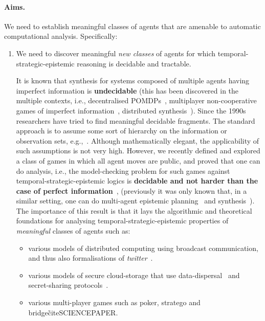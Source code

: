 \documentclass[a4paper,12pt,smallheadings]{scrartcl}
\newcommand\pomdp{\textsf{POMDP}}
\begin{document}
\paragraph{Aims.} 
We need to establish meaningful classes of agents that are amenable to automatic computational analysis.
Specifically: 
\begin{enumerate}
 \item We need to discover meaningful \emph{new classes} of agents for which temporal-strategic-epistemic reasoning is decidable and tractable. 


It is known that synthesis for systems composed of multiple agents having imperfect information is \textbf{undecidable} (this has been discovered in the 
 multiple contexts, i.e., decentralised \pomdp s~\cite{DBLP:journals/mor/BernsteinGIZ02}, multiplayer non-cooperative games of imperfect information~\cite{peterson2001lower}, distributed synthesis~\cite{DBLP:conf/focs/PnueliR90}). 
Since the 1990s researchers have tried to find meaningful decidable fragments. The standard approach is to assume some sort of hierarchy on the information or 
observation sets, e.g.,~\cite{DBLP:conf/atva/BerwangerMB15}. Although mathematically elegant, the applicability of such assumptions is not very high. 
However, we recently defined and explored a class of games in which all agent moves are public, and proved that one can do analysis, i.e., the model-checking problem for such games against temporal-strategic-epistemic logics is \textbf{decidable and not harder than the case of perfect information}~, (previously it was only known that, in a similar setting, one can do multi-agent epistemic planning~\cite{DBLP:conf/aips/KominisG15} and synthesis~\cite{vanderMeyden2005}). 
The importance of this result is that it lays the algorithmic and theoretical foundations for analysing temporal-strategic-epistemic properties of \emph{meaningful} classes of agents such as: %
\begin{itemize}
 \item various models of distributed computing using broadcast communication, and thus also formalisations of \emph{twitter}~\cite{DeNicola2015,DBLP:journals/jlp/MaggiPST17}. 
 \item various models of secure cloud-storage that use data-dispersal~\cite{DBLP:journals/internet/LiQLL16} and secret-sharing protocols~\cite{ADGH06}.
 \item various multi-player games such as poker, stratego and bridge\~cite{SCIENCEPAPER}.


\end{itemize}
\end{enumerate}
\end{document}
